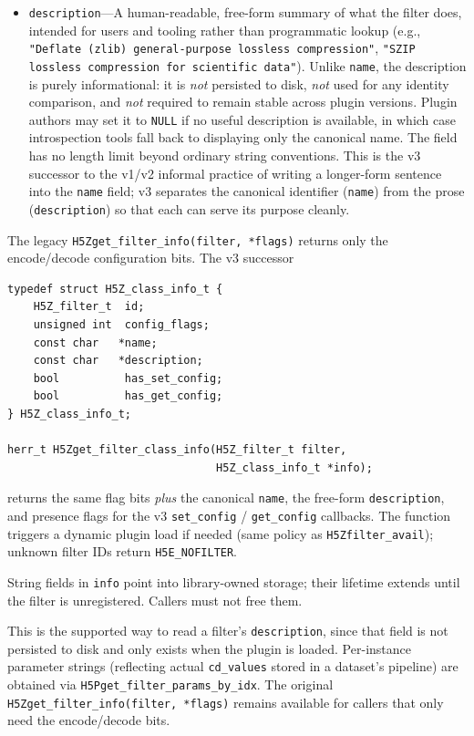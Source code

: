 \documentclass[../RFC-HDFG-2026-001.tex]{subfiles}
\begin{document}
\begin{itemize}
\item \texttt{description}---A human-readable, free-form summary of
  what the filter does, intended for users and tooling rather than
  programmatic lookup (e.g., \texttt{"Deflate (zlib) general-purpose
  lossless compression"}, \texttt{"SZIP lossless compression for
  scientific data"}).  Unlike \texttt{name}, the description is purely
  informational: it is \emph{not} persisted to disk, \emph{not} used
  for any identity comparison, and \emph{not} required to remain
  stable across plugin versions.  Plugin authors may set it to
  \texttt{NULL} if no useful description is available, in which case
  introspection tools fall back to displaying only the canonical
  name.  The field has no length limit beyond ordinary string
  conventions.  This is the v3 successor to the v1/v2 informal
  practice of writing a longer-form sentence into the \texttt{name}
  field; v3 separates the canonical identifier (\texttt{name}) from
  the prose (\texttt{description}) so that each can serve its purpose
  cleanly.
\end{itemize}

\label{sec:H5Zget-filter-info2}

The legacy \texttt{H5Zget\_filter\_info(filter, *flags)} returns only the
encode/decode configuration bits.  The v3 successor

\begin{verbatim}
typedef struct H5Z_class_info_t {
    H5Z_filter_t  id;
    unsigned int  config_flags;
    const char   *name;
    const char   *description;
    bool          has_set_config;
    bool          has_get_config;
} H5Z_class_info_t;

herr_t H5Zget_filter_class_info(H5Z_filter_t filter,
                                H5Z_class_info_t *info);
\end{verbatim}

\noindent returns the same flag bits \emph{plus} the canonical \texttt{name},
the free-form \texttt{description}, and presence flags for the v3
\texttt{set\_config} / \texttt{get\_config} callbacks.  The function triggers
a dynamic plugin load if needed (same policy as \texttt{H5Zfilter\_avail});
unknown filter IDs return \texttt{H5E\_NOFILTER}.

String fields in \texttt{info} point into library-owned storage; their
lifetime extends until the filter is unregistered.  Callers must not
free them.

This is the supported way to read a filter's \texttt{description}, since
that field is not persisted to disk and only exists when the plugin is
loaded.  Per-instance parameter strings (reflecting actual \texttt{cd\_values}
stored in a dataset's pipeline) are obtained via
\texttt{H5Pget\_filter\_params\_by\_idx}.  The original
\texttt{H5Zget\_filter\_info(filter, *flags)} remains available for callers
that only need the encode/decode bits.
\end{document}
